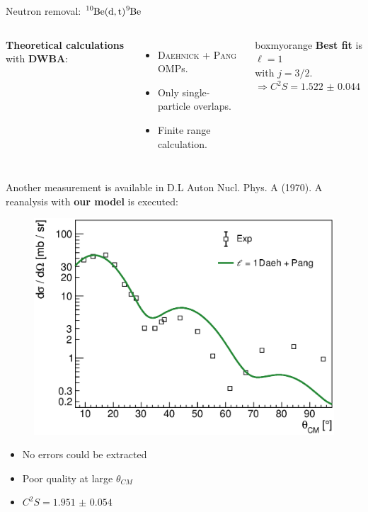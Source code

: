 \documentclass[sans,
frameno, %
mp,
usenames,dvipsnames, %
onlytextwidth, %
t,%
11pt]{beamer}
\newcommand{\notice}[1]{\textbf{\alert{#1}}}
\newcommand{\iso}[2]{\ce{^{#1}#2}}
\begin{document}
\begin{frame}{Neutron removal: $\iso{10}{Be}(\textrm{d}, \textrm{t})\iso{9}{Be}$}
{\begin{figure}
\begin{minipage}[t]{0.48\linewidth}
            \end{minipage}
        \end{figure}
        \medskip
        \begin{columns}
            {
                \notice{Theoretical calculations} with \textbf{DWBA}:
                \begin{itemize}
                    \item \textsc{Daehnick} + \textsc{Pang} OMPs.
                    \item Only single-particle overlaps.
                    \item Finite range calculation.
                \end{itemize}
            }\hfill
            {

                \begin{beamercolorbox}[sep=1ex, center, rounded=true]{boxmyorange}
                    \textbf{Best fit} is $\ell = 1$\\
                    with $j = 3/2$.\\
                    $\Rightarrow C^2S = \qty{1.522(44)}{}$
                \end{beamercolorbox}

            }
        \end{columns}

    }
    \only<+>
    {
        \addtocounter{framenumber}{1}
        Another measurement is available in {\small D.L Auton Nucl. Phys. A (1970)}. A reanalysis with \textbf{our model} is executed:

        \begin{figure}
            \centering
            \includegraphics[width=0.5\linewidth]{figures/Workshop/auton.eps}
        \end{figure}
        \medskip
        \begin{itemize}
            \item No errors could be extracted
            \item Poor quality at large $\theta_{CM}$
            \item $C^2S = \num{1.951(54)}$
        \end{itemize}

}
\end{frame}
\end{document}
